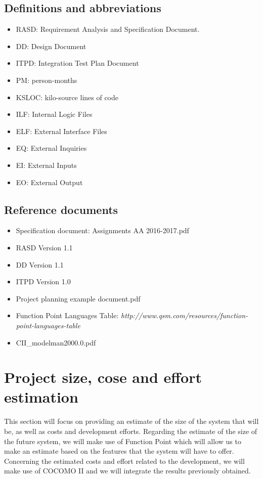 \documentclass[10pt, a4paper,titlepage]{article}
\begin{document}
\subsection{Definitions and abbreviations}
\begin{itemize}
\item RASD: Requirement Analysis and Specification Document.
\item DD: Design Document
\item ITPD: Integration Test Plan Document
\item PM: person-months
\item KSLOC: kilo-source lines of code
\item ILF: Internal Logic Files
\item ELF: External Interface Files
\item EQ: External Inquiries
\item EI: External Inputs
\item EO: External Output
\end{itemize}
\subsection{Reference documents}
\begin{itemize}
\item Speciﬁcation document: Assignments AA 2016-2017.pdf
\item RASD Version 1.1    
\item DD Version 1.1
\item ITPD Version 1.0
\item Project planning example document.pdf
\item Function Point Languages Table: \emph{http://www.qsm.com/resources/function-point-languages-table}
\item CII\_modelman2000.0.pdf
\end{itemize}
\section{Project size, cose and effort estimation}
This section will focus on providing an estimate of the size of the system that will be, as well as costs and development efforts.
Regarding the estimate of the size of the future system, we will make use of Function Point which will allow us to make an estimate based on the features that the system will have to offer.
Concerning the estimated costs and effort related to the development, we will make use of COCOMO II and we will integrate the results previously obtained.
\end{document}
